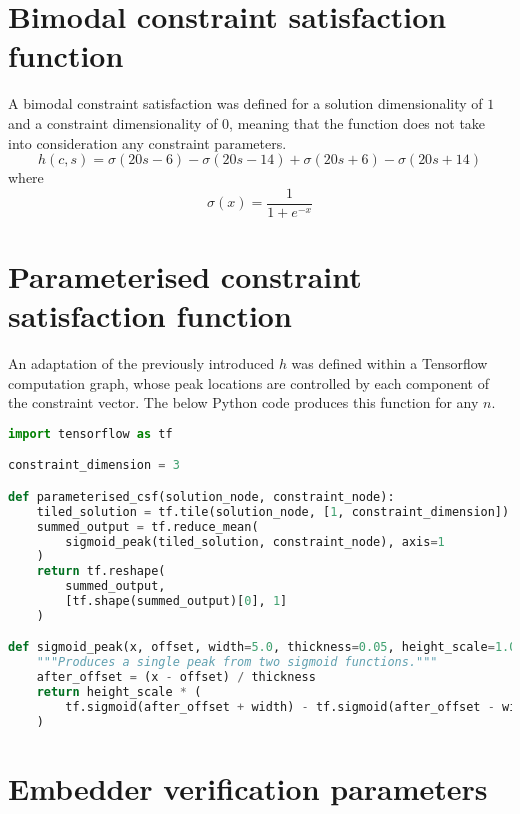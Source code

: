 \documentclass[../main.tex]{subfiles}
\begin{document}
\section{Bimodal constraint satisfaction function} \label{appendix:bimodalCSF}

A bimodal constraint satisfaction was defined for a solution dimensionality of $1$ and a constraint dimensionality of $0$, meaning that the function does not take into consideration any constraint parameters.
\begin{equation}
    h(c,s)=\sigma(20s-6)-\sigma(20s-14)+\sigma(20s+6)-\sigma(20s+14)
\end{equation}
where
\begin{equation}
    \sigma(x)=\frac{1}{1+e^{-x}}
\end{equation}

\section{Parameterised constraint satisfaction function} \label{appendix:tensorflowCSF}

An adaptation of the previously introduced $h$ was defined within a Tensorflow computation graph, whose peak locations are controlled by each component of the constraint vector.
The below Python code produces this function for any $n$.
\begin{lstlisting}[language=python,firstnumber=1,caption={Python code to produce a constraint satisfaction function parameterised by a constraint vector within a Tensorflow computation graph.},captionpos=b]
import tensorflow as tf

constraint_dimension = 3

def parameterised_csf(solution_node, constraint_node):
    tiled_solution = tf.tile(solution_node, [1, constraint_dimension])
    summed_output = tf.reduce_mean(
        sigmoid_peak(tiled_solution, constraint_node), axis=1
    )
    return tf.reshape(
        summed_output,
        [tf.shape(summed_output)[0], 1]
    )

def sigmoid_peak(x, offset, width=5.0, thickness=0.05, height_scale=1.0):
    """Produces a single peak from two sigmoid functions."""
    after_offset = (x - offset) / thickness
    return height_scale * (
        tf.sigmoid(after_offset + width) - tf.sigmoid(after_offset - width)
    )
\end{lstlisting}

\section{Embedder verification parameters} \label{appendix:embedderVerificationParameters}
\end{document}
